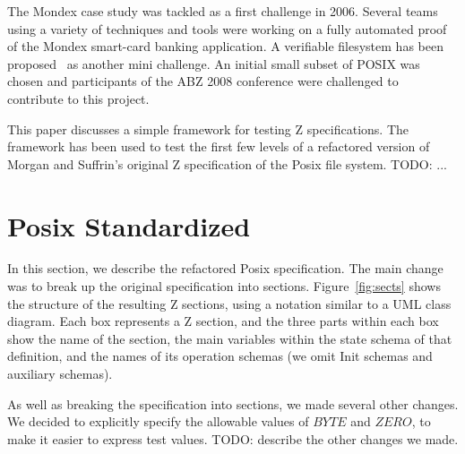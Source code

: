 \documentclass{llncs}
\begin{document}
The Mondex case study was tackled as a first challenge in 2006.
Several teams using a variety of techniques and tools were working on
a fully automated proof of the Mondex smart-card banking application.
A verifiable filesystem has been proposed~\cite{JosHol07} as another
mini challenge.  An initial small subset of POSIX was chosen and
participants of the ABZ 2008 conference were challenged to contribute
to this project.

This paper discusses a simple framework for testing Z specifications.
The framework has been used to test the first few levels of a
refactored version of Morgan and Suffrin's original Z specification of
the Posix file system. TODO: ...



\section{Posix Standardized}

In this section, we describe the refactored Posix specification.
The main change was to break up the original specification into
sections.  Figure~\ref{fig:sects} shows the structure of the
resulting Z sections, using a notation similar to a UML class diagram.
Each box represents a Z section, and the three parts within each box
show the name of the section, the main variables within the state
schema of that definition, and the names of its operation schemas
(we omit Init schemas and auxiliary schemas).

As well as breaking the specification into sections, we made several other
changes.  We decided to explicitly specify the allowable values of $BYTE$
and $ZERO$, to make it easier to express test values.  TODO: describe the
other changes we made.
\end{document}
